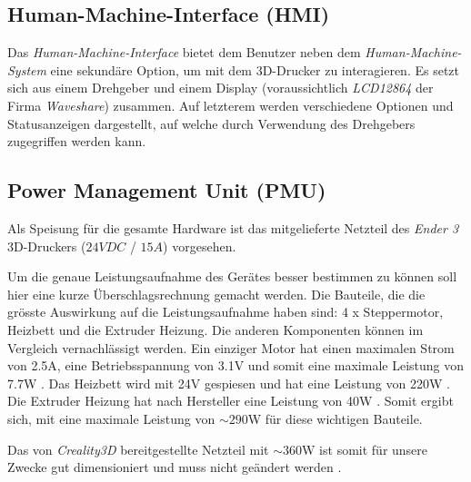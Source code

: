 \subsection{Human-Machine-Interface (HMI)}\label{subsec:HMI}
Das \textit{Human-Machine-Interface} bietet dem Benutzer neben dem \textit{Human-Machine-System} eine sekundäre Option, um mit dem 3D-Drucker zu interagieren. Es setzt sich aus einem Drehgeber und einem Display (voraussichtlich \textit{LCD12864} der Firma \textit{Waveshare}) zusammen. Auf letzterem werden verschiedene Optionen und Statusanzeigen dargestellt, auf welche durch Verwendung des Drehgebers zugegriffen werden kann.


\subsection{Power Management Unit (PMU)}\label{subsec:PMU}
Als Speisung für die gesamte Hardware ist das mitgelieferte Netzteil des \textit{Ender 3} 3D-Druckers ($24 VDC$ / $15A$) vorgesehen. 

Um die genaue Leistungsaufnahme des Gerätes besser bestimmen zu können soll hier eine kurze Überschlagsrechnung gemacht werden. Die Bauteile, die die grösste Auswirkung auf die Leistungsaufnahme haben sind: 4 x Steppermotor, Heizbett und die Extruder Heizung. Die anderen Komponenten können im Vergleich vernachlässigt werden. Ein einziger Motor hat einen maximalen Strom von 2.5A, eine Betriebsspannung von 3.1V und somit eine maximale Leistung von 7.7W \cite{steppermotor}. Das Heizbett wird mit 24V gespiesen und hat eine Leistung von 220W \cite{Heizbett_Ender3}.
Die Extruder Heizung hat nach Hersteller eine Leistung von 40W \cite{Extruder_Heizung}. Somit ergibt sich, mit eine maximale Leistung von $\sim290$W für diese wichtigen Bauteile.

Das von \textit{Creality3D} bereitgestellte Netzteil mit $\sim360$W ist somit für unsere Zwecke gut dimensioniert und muss nicht geändert werden \cite{ender3_spezifiaktion}. 

